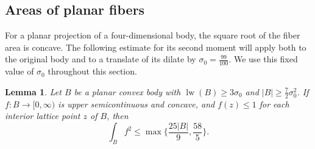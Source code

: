 \documentclass[reqno, 11pt]{article}
\numberwithin{equation}{section}
\newtheorem{lemma}[lemma]{Lemma}
\theoremstyle{definition}
\DeclareMathOperator{\lw}{lw}
\begin{document}
\subsection{Areas of planar fibers}

For a planar projection of a four-dimensional body, the square root
of the fiber area is concave. The following estimate for its second
moment will apply both to the original body and to a translate of its
dilate by $\sigma_0=\frac{99}{100}$. We use this fixed value of $\sigma_0$
throughout this section.

\begin{lemma}\label{aux:planar-moment}
Let $B$ be a planar convex body with
$\lw(B)\ge3\sigma_0$ and $|B|\ge\frac{7}{2}\sigma_0^2$. If
$f\colon B\to[0,\infty)$ is upper semicontinuous and concave, and
$f(z)\le1$ for each interior lattice point $z$ of $B$, then
\[
                     \int_B f^2\le\max\{\frac{25|B|}{9},\frac{58}{5}\}.
\]
\end{lemma}
\end{document}
